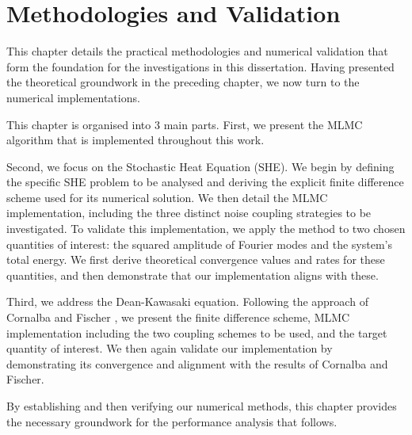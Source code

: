 \chapter{Methodologies and Validation}\label{chap:method_and_validation}

This chapter details the practical methodologies and numerical validation 
that form the foundation for the investigations in this dissertation. Having 
presented the theoretical groundwork in the preceding chapter, we now 
turn to the numerical implementations.

This chapter is organised into 3 main parts. First, 
we present the MLMC algorithm that is implemented throughout this work.


Second, we focus on the Stochastic Heat Equation (SHE). We begin
by defining the specific SHE problem to be analysed and 
deriving the explicit finite difference scheme 
used for its numerical solution. We then 
detail the MLMC implementation,
including the three distinct noise coupling strategies to be investigated. 
To validate this implementation, we apply the method to two  
chosen quantities of interest: the squared amplitude of
Fourier modes and the system's total energy. We first derive 
theoretical convergence values and rates for these quantities, and then demonstrate that
our implementation aligns with these.

Third, we address the Dean-Kawasaki equation. Following 
the approach of Cornalba and Fischer \cite{cornalba2025multilevel}, 
we present the finite difference scheme, MLMC implementation including the two coupling 
schemes to be used, and the target 
quantity of interest. 
We then again validate our implementation
by demonstrating its convergence and alignment with the results of Cornalba and Fischer.

By establishing and then verifying our numerical methods, this chapter 
provides the necessary groundwork for the performance analysis that follows.






